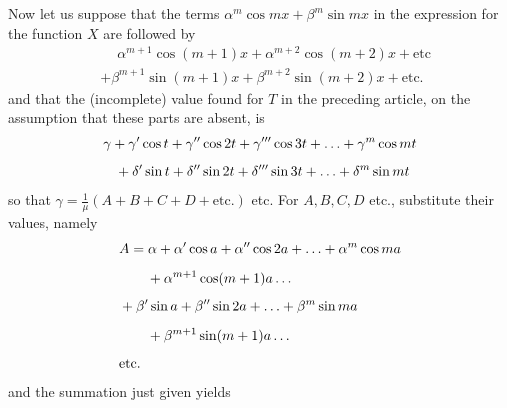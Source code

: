 Now let us suppose that the terms \(\alpha^m\cos mx+\beta^m\sin mx\) in the expression for the function \(X\) are followed by
\[
\begin{aligned}
&\phantom{{}+{}}\alpha^{m+1}\cos(m+1)x+\alpha^{m+2}\cos(m+2)x+\mathrm{etc}\\[5pt]
&+\beta^{m+1}\sin(m+1)x+\beta^{m+2}\sin(m+2)x+\mathrm{etc.}
\end{aligned}
\]
and that the (incomplete) value found for \(T\) in the preceding article, on the assumption
that these parts are absent, is
\[
\begin{aligned}
&\gamma+\gamma'\cos t+\gamma''\cos2t+\gamma'''\cos3t+\mathinner{.\,.\,.}+\gamma^m\cos mt\\[5pt]
&\phantom{\gamma}\;+\delta'\sin t+\delta''\sin2t+\delta'''\sin3t+\mathinner{.\,.\,.}+\delta^m\sin mt
\end{aligned}
\]
so that \(\gamma=\frac{1}{\mu}(A+B+C+D+\mathrm{etc.})\) etc. For \(A,B,C,D\)
etc., substitute their values, namely
\[
\begin{aligned}
&A=\alpha+\alpha'\cos a+\alpha''\cos2a+\mathinner{.\,.\,.}+\alpha^m\cos ma\\[5pt]&\qquad{}+\alpha^{m+1}\cos(m+1)a\mathinner{.\,.\,.}\\[5pt]
&+\beta'\sin a+\beta''\sin2a+\mathinner{.\,.\,.}+\beta^m\sin ma\\[5pt]&\qquad{}+\beta^{m+1}\sin(m+1)a\mathinner{.\,.\,.}\\[5pt]
&\mathrm{etc.}
\end{aligned}
\]
and the summation just given yields
